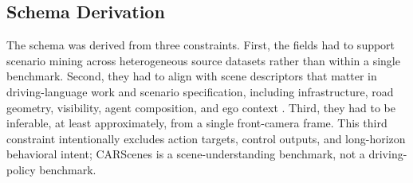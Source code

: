 \subsection{Schema Derivation}
The schema was derived from three constraints. First, the fields had to support scenario mining across heterogeneous source datasets rather than within a single benchmark. Second, they had to align with scene descriptors that matter in driving-language work and scenario specification, including infrastructure, road geometry, visibility, agent composition, and ego context \cite{RefWorks:sima2024drivelm,RefWorks:qian2024nuscenesqa,RefWorks:rivera2025scenario,RefWorks:fremont2019scenic,RefWorks:kung2024riskbench}. Third, they had to be inferable, at least approximately, from a single front-camera frame. This third constraint intentionally excludes action targets, control outputs, and long-horizon behavioral intent; CARScenes is a scene-understanding benchmark, not a driving-policy benchmark.

